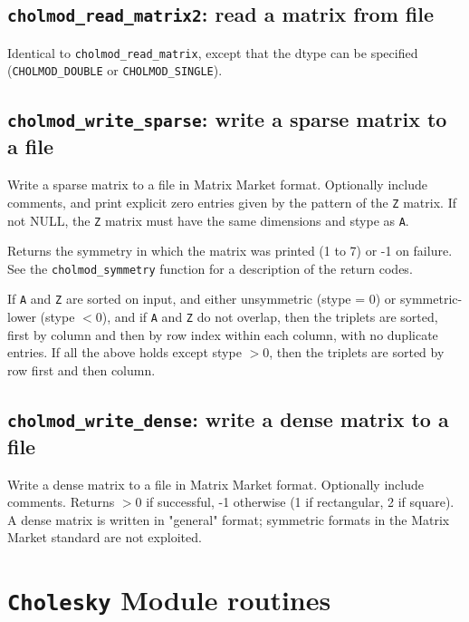\documentclass[11pt]{article}
\begin{document}
\subsection{{\tt cholmod\_read\_matrix2}: read a matrix from file}


Identical to \verb'cholmod_read_matrix', except that the dtype can be
specified (\verb'CHOLMOD_DOUBLE' or \verb'CHOLMOD_SINGLE').

\subsection{{\tt cholmod\_write\_sparse}: write a sparse matrix to a file}


Write a sparse matrix to a file in Matrix Market format.   Optionally include
comments, and print explicit zero entries given by the pattern of the {\tt Z}
matrix.  If not NULL, the {\tt Z} matrix must have the same dimensions and stype
as {\tt A}.

Returns the symmetry in which the matrix was printed (1 to 7) or -1 on failure.
See the {\tt cholmod\_symmetry} function for a description of the return codes.

If {\tt A} and {\tt Z} are sorted on input, and either unsymmetric (stype = 0)
or symmetric-lower (stype $< 0$), and if {\tt A} and {\tt Z} do not overlap,
then the triplets are sorted, first by column and then by row index within each
column, with no duplicate entries.  If all the above holds except stype $> 0$,
then the triplets are sorted by row first and then column.

\subsection{{\tt cholmod\_write\_dense}: write a dense matrix to a file}


Write a dense matrix to a file in Matrix Market format.   Optionally include
comments.  Returns $> 0$ if successful, -1 otherwise (1 if rectangular, 2 if
square).  A dense matrix is written in "general" format; symmetric formats in
the Matrix Market standard are not exploited.

\newpage \section{{\tt Cholesky} Module routines}
\end{document}
